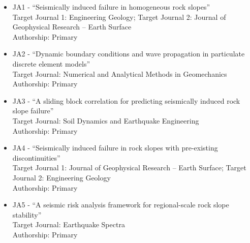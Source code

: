 \documentclass[10pt,letterpaper]{article}
\begin{document}
\begin{itemize}
\item JA1 - ``Seismically induced failure in homogeneous rock slopes''
\\Target Journal 1: Engineering Geology; Target Journal 2: Journal of Geophysical Research -- Earth Surface
\\ Authorship: Primary
\item JA2 - ``Dynamic boundary conditions and wave propagation in particulate discrete element models''
\\Target Journal: Numerical and Analytical Methods in Geomechanics
\\ Authorship: Primary
\item JA3 - ``A sliding block correlation for predicting seismically induced rock slope failure''
\\ Target Journal: Soil Dynamics and Earthquake Engineering
\\ Authorship: Primary
\item JA4 - ``Seismically induced failure in rock slopes with pre-existing discontinuities''
\\ Target Journal 1: Journal of Geophysical Research -- Earth Surface; Target Journal 2: Engineering Geology
\\ Authorship: Primary
\item JA5 - ``A seismic risk analysis framework for regional-scale rock slope stability''
\\ Target Journal: Earthquake Spectra
\\ Authorship: Primary
\end{itemize}
\end{document}
